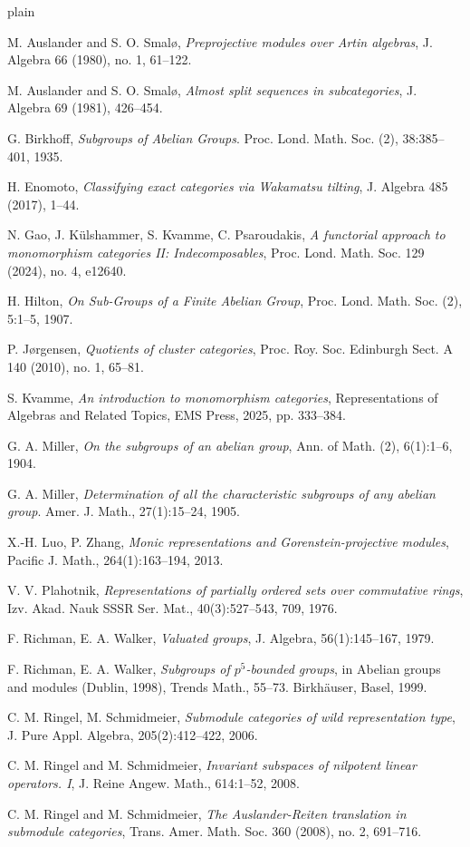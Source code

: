 \documentclass[a4paper]{amsart}
\numberwithin{equation}{section} \theoremstyle{plain}
\numberwithin{thm}{section}
\begin{document}
\begin{thebibliography}{plain}

 M. Auslander and S. O. Smal\o, \emph{Preprojective modules over Artin algebras}, J. Algebra 66 (1980), no. 1, 61--122.

 M. Auslander and S. O. Smal\o, \emph{Almost split sequences in subcategories}, J. Algebra 69 (1981), 426--454.

 G. Birkhoff, \emph{Subgroups of Abelian Groups}. Proc. Lond. Math. Soc. (2), 38:385--401, 1935.

 H. Enomoto, \emph{Classifying exact categories via Wakamatsu tilting}, J. Algebra 485 (2017), 1--44.

 N. Gao, J. K\"ulshammer, S. Kvamme, C. Psaroudakis, \emph{A functorial approach to monomorphism categories II: Indecomposables}, Proc. Lond. Math. Soc. 129 (2024), no. 4, e12640.

 H. Hilton, \emph{On Sub-Groups of a Finite Abelian Group}, Proc. Lond. Math. Soc. (2), 5:1--5, 1907.

 P. J{\o}rgensen, \emph{Quotients of cluster categories}, Proc. Roy. Soc. Edinburgh Sect. A 140 (2010), no. 1, 65--81.

 S. Kvamme, \emph{An introduction to monomorphism categories}, Representations of Algebras and Related Topics, EMS Press, 2025, pp. 333--384.

 G. A. Miller, \emph{On the subgroups of an abelian group}, Ann. of Math. (2), 6(1):1--6, 1904.

 G. A. Miller, \emph{Determination of all the characteristic subgroups of any abelian group}. Amer. J. Math.,
27(1):15--24, 1905.

 X.-H. Luo, P. Zhang, \emph{Monic representations and Gorenstein-projective modules}, Pacific J. Math., 264(1):163--194, 2013.

 V. V. Plahotnik, \emph{Representations of partially ordered sets over commutative rings}, Izv. Akad. Nauk
SSSR Ser. Mat., 40(3):527--543, 709, 1976.

 F. Richman, E. A. Walker, \emph{Valuated groups}, J. Algebra, 56(1):145--167, 1979.

 F. Richman, E. A. Walker, \emph{Subgroups of $p^5$-bounded groups}, in Abelian groups and
modules (Dublin, 1998), Trends Math., 55--73. Birkh\"auser, Basel, 1999.

 C. M. Ringel, M. Schmidmeier, \emph{Submodule categories of wild representation type},
J. Pure Appl. Algebra, 205(2):412--422, 2006.

 C. M. Ringel and M. Schmidmeier, \emph{Invariant subspaces of nilpotent linear operators. I},
J. Reine Angew. Math., 614:1--52, 2008.

 C. M. Ringel and M. Schmidmeier, \emph{The Auslander-Reiten translation in submodule categories}, Trans. Amer. Math. Soc. 360 (2008), no. 2, 691--716.

\end{thebibliography}
\end{document}
